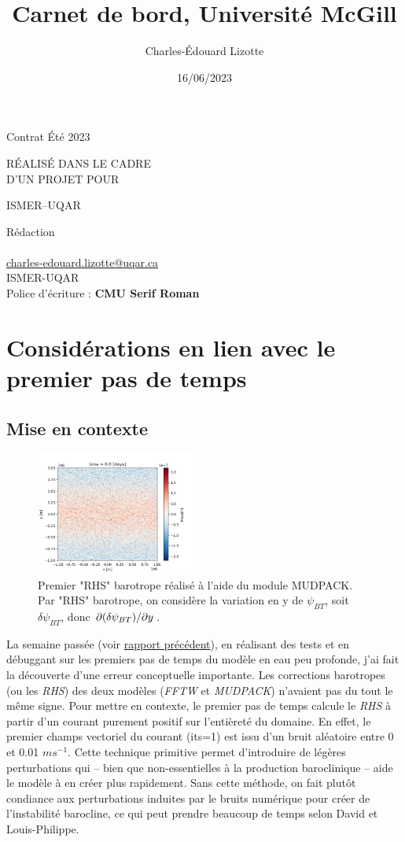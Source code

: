 \documentclass[10pt]{article}
\author{Charles-Édouard Lizotte}
\date{16/06/2023}
\title{Carnet de bord, Université McGill}
\makeatletter
\numberwithin{equation}{section}
\newcommand{\mytitlepage}{
\begin{titlepage}
\begin{center}
{\Huge \thesubtitle \par}
\vspace{2cm}
{\Huge \MakeUppercase{\thetitle} \par}
\vspace{2cm}
RÉALISÉ DANS LE CADRE\\ D'UN PROJET POUR \par
\vspace{2cm}
{\Huge ISMER--UQAR \par}
\vspace{2cm}
{\thedate}
\end{center}
\vfill
Rédaction \\
{\theauthor}\\
\url{charles-edouard.lizotte@uqar.ca}\\
ISMER-UQAR\\
Police d'écriture : \textbf{CMU Serif Roman}
\end{titlepage}
}
\newcommand{\thesubtitle}{Contrat Été 2023}
\makeatother
\begin{document}
\mytitlepage
\tableofcontents\newpage



\section{Considérations en lien avec le premier pas de temps}
\label{sec:orgee5050d}
\subsection{Mise en contexte}
\label{sec:orgf14b7f1}
\begin{figure} \vspace{-\baselineskip} \centering
\centering
\includegraphics[width=0.48\textwidth]{figures/debuggage/2023_06_12_RHSuBTmudpack.png}
\caption{\label{fig:orgfb2623a}Premier "RHS" barotrope réalisé à l'aide du module MUDPACK. Par "RHS" barotrope, on considère la variation en y de \(\psi_{BT}\), soit \(\delta \psi_{BT}\), donc \(\pdv*{(\delta \psi_{BT})}{y}\).}
\end{figure}


La semaine passée (voir \href{rapport-2023-06-03.org}{rapport précédent}), en réalisant des tests et en débuggant sur les premiers pas de temps du modèle en eau peu profonde, j'ai fait la découverte d'une erreur conceptuelle importante.
Les corrections barotropes (ou les \emph{RHS}) des deux modèles (\emph{FFTW} et \emph{MUDPACK}) n'avaient pas du tout le même signe.
Pour mettre en contexte, le premier pas de temps calcule le \emph{RHS} à partir d'un courant purement positif sur l'entièreté du domaine.
En effet, le premier champs vectoriel du courant (its=1) est issu d'un bruit aléatoire entre 0 et 0.01 \(ms^{-1}\).
Cette technique primitive permet d'introduire de légères perturbations qui -- bien que non-essentielles à la production baroclinique -- aide le modèle à en créer plus rapidement.
Sans cette méthode, on fait plutôt condiance aux perturbations induites par le bruits numérique pour créer de l'instabilité barocline, ce qui peut prendre beaucoup de temps selon David et Louis-Philippe. \bigskip
\end{document}

